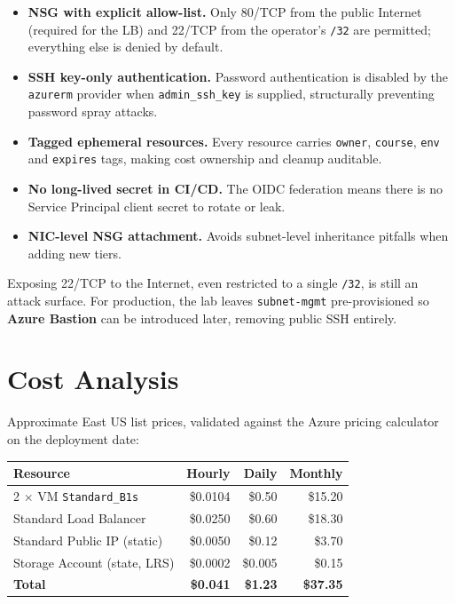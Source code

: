 \documentclass[10pt,a4paper,twocolumn]{article}
\begin{document}
\begin{itemize}
  \item \textbf{NSG with explicit allow-list.} Only 80/TCP from the
        public Internet (required for the LB) and 22/TCP from the
        operator's \texttt{/32} are permitted; everything else is
        denied by default.
  \item \textbf{SSH key-only authentication.} Password authentication
        is disabled by the \texttt{azurerm} provider when
        \texttt{admin\_ssh\_key} is supplied, structurally preventing
        password spray attacks.
  \item \textbf{Tagged ephemeral resources.} Every resource carries
        \texttt{owner}, \texttt{course}, \texttt{env} and
        \texttt{expires} tags, making cost ownership and cleanup
        auditable.
  \item \textbf{No long-lived secret in CI/CD.} The OIDC federation
        means there is no Service Principal client secret to rotate or
        leak.
  \item \textbf{NIC-level NSG attachment.} Avoids subnet-level
        inheritance pitfalls when adding new tiers.
\end{itemize}

\begin{warningbox}
Exposing 22/TCP to the Internet, even restricted to a single \texttt{/32},
is still an attack surface. For production, the lab leaves
\texttt{subnet-mgmt} pre-provisioned so \textbf{Azure Bastion} can be
introduced later, removing public SSH entirely.
\end{warningbox}

\section{Cost Analysis}

Approximate East US list prices, validated against the Azure pricing
calculator on the deployment date:

\begin{center}
\small
\begin{tabular}{@{}lrrr@{}}
\toprule
\textbf{Resource} & \textbf{Hourly} & \textbf{Daily} & \textbf{Monthly} \\
\midrule
2 $\times$ VM \texttt{Standard\_B1s} & \$0.0104 & \$0.50 & \$15.20 \\
Standard Load Balancer            & \$0.0250 & \$0.60 & \$18.30 \\
Standard Public IP (static)       & \$0.0050 & \$0.12 & \$3.70 \\
Storage Account (state, LRS)      & \$0.0002 & \$0.005 & \$0.15 \\
\midrule
\textbf{Total}                    & \textbf{\$0.041} & \textbf{\$1.23} & \textbf{\$37.35} \\
\bottomrule
\end{tabular}
\end{center}
\end{document}
